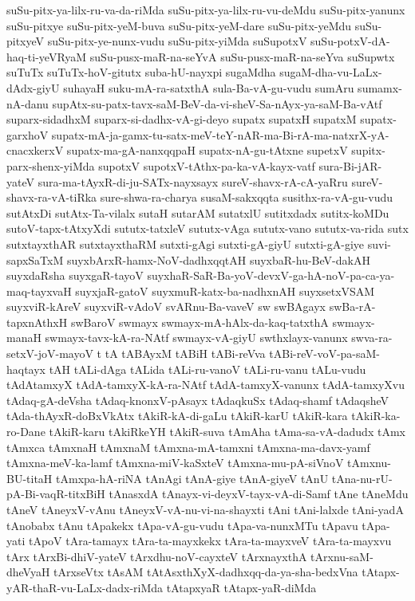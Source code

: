 {suSu-pitx-ya-lilx-ru-va-da-riMda
suSu-pitx-ya-lilx-ru-vu-deMdu
suSu-pitx-yanunx
suSu-pitxye
suSu-pitx-yeM-buva
suSu-pitx-yeM-dare
suSu-pitx-yeMdu
suSu-pitxyeV
suSu-pitx-ye-nunx-vudu
suSu-pitx-yiMda
suSupotxV
suSu-potxV-dA-haq-ti-yeVRyaM
suSu-pusx-maR-na-seYvA
suSu-pusx-maR-na-seYva
suSupwtx
suTuTx
suTuTx-hoV-gitutx
suba-hU-nayxpi
sugaMdha
sugaM-dha-vu-LaLx-dAdx-giyU
suhayaH
suku-mA-ra-satxthA
sula-Ba-vA-gu-vudu
sumAru
sumamx-nA-danu
supAtx-su-patx-tavx-saM-BeV-da-vi-sheV-Sa-nAyx-ya-saM-Ba-vAtf
suparx-sidadhxM
suparx-si-dadhx-vA-gi-deyo
supatx
supatxH
supatxM
supatx-garxhoV
supatx-mA-ja-gamx-tu-satx-meV-teY-nAR-ma-Bi-rA-ma-natxrX-yA-cnacxkerxV
supatx-ma-gA-nanxqqpaH
supatx-nA-gu-tAtxne
supetxV
supitx-parx-shenx-yiMda
supotxV
supotxV-tAthx-pa-ka-vA-kayx-vatf
sura-Bi-jAR-yateV
sura-ma-tAyxR-di-ju-SATx-nayxsayx
sureV-shavx-rA-cA-yaRru
sureV-shavx-ra-vA-tiRka
sure-shwa-ra-charya
susaM-sakxqqta
susithx-ra-vA-gu-vudu
sutAtxDi
sutAtx-Ta-vilalx
sutaH
sutarAM
sutatxlU
sutitxdadx
sutitx-koMDu
sutoV-tapx-tAtxyXdi
sututx-tatxleV
sututx-vAga
sututx-vano
sututx-va-rida
sutx
sutxtayxthAR
sutxtayxthaRM
sutxti-gAgi
sutxti-gA-giyU
sutxti-gA-giye
suvi-sapxSaTxM
suyxbArxR-hamx-NoV-dadhxqqtAH
suyxbaR-hu-BeV-dakAH
suyxdaRsha
suyxgaR-tayoV
suyxhaR-SaR-Ba-yoV-devxV-ga-hA-noV-pa-ca-ya-maq-tayxvaH
suyxjaR-gatoV
suyxmuR-katx-ba-nadhxnAH
suyxsetxVSAM
suyxviR-kAreV
suyxviR-vAdoV
svARnu-Ba-vaveV
sw
swBAgayx
swBa-rA-tapxnAthxH
swBaroV
swmayx
swmayx-mA-hAlx-da-kaq-tatxthA
swmayx-manaH
swmayx-tavx-kA-ra-NAtf
swmayx-vA-giyU
swthxlayx-vanunx
swva-ra-setxV-joV-mayoV
t
tA
tABAyxM
tABiH
tABi-reVva
tABi-reV-voV-pa-saM-haqtayx
tAH
tALi-dAga
tALida
tALi-ru-vanoV
tALi-ru-vanu
tALu-vudu
tAdAtamxyX
tAdA-tamxyX-kA-ra-NAtf
tAdA-tamxyX-vanunx
tAdA-tamxyXvu
tAdaq-gA-deVsha
tAdaq-knonxV-pAsayx
tAdaqkuSx
tAdaq-shamf
tAdaqsheV
tAda-thAyxR-doBxVkAtx
tAkiR-kA-di-gaLu
tAkiR-karU
tAkiR-kara
tAkiR-ka-ro-Dane
tAkiR-karu
tAkiRkeYH
tAkiR-suva
tAmAha
tAma-sa-vA-dadudx
tAmx
tAmxca
tAmxnaH
tAmxnaM
tAmxna-mA-tamxni
tAmxna-ma-davx-yamf
tAmxna-meV-ka-lamf
tAmxna-miV-kaSxteV
tAmxna-mu-pA-siVnoV
tAmxnu-BU-titaH
tAmxpa-hA-riNA
tAnAgi
tAnA-giye
tAnA-giyeV
tAnU
tAna-nu-rU-pA-Bi-vaqR-titxBiH
tAnasxdA
tAnayx-vi-deyxV-tayx-vA-di-Samf
tAne
tAneMdu
tAneV
tAneyxV-vAnu
tAneyxV-vA-nu-vi-na-shayxti
tAni
tAni-lalxde
tAni-yadA
tAnobabx
tAnu
tApakekx
tApa-vA-gu-vudu
tApa-va-nunxMTu
tApavu
tApa-yati
tApoV
tAra-tamayx
tAra-ta-mayxkekx
tAra-ta-mayxveV
tAra-ta-mayxvu
tArx
tArxBi-dhiV-yateV
tArxdhu-noV-cayxteV
tArxnayxthA
tArxnu-saM-dheVyaH
tArxseVtx
tAsAM
tAtAsxthXyX-dadhxqq-da-ya-sha-bedxVna
tAtapx-yAR-thaR-vu-LaLx-dadx-riMda
tAtapxyaR
tAtapx-yaR-diMda
}
